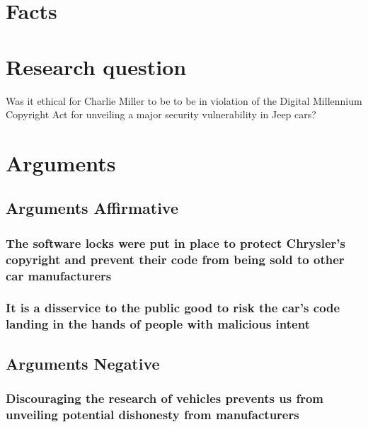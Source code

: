 \documentclass[12pt]{article}
\begin{document}
\tableofcontents
\newpage
\begin{multicols}{2}

\section{Facts}

\section{Research question}
Was it ethical for Charlie Miller to be to be in violation of the Digital Millennium Copyright Act for unveiling a major security vulnerability in Jeep cars?

\section{Arguments}

\subsection{Arguments Affirmative}
\subsubsection{The software locks were put in place to protect Chrysler's copyright and prevent their code from being sold to other car manufacturers}

     
\subsubsection{It is a disservice to the public good to risk the car's code landing in the hands of people with malicious intent}

\subsection{Arguments Negative}

\subsubsection{Discouraging the research of vehicles prevents us from unveiling potential dishonesty from manufacturers}


\end{multicols}
\end{document}

